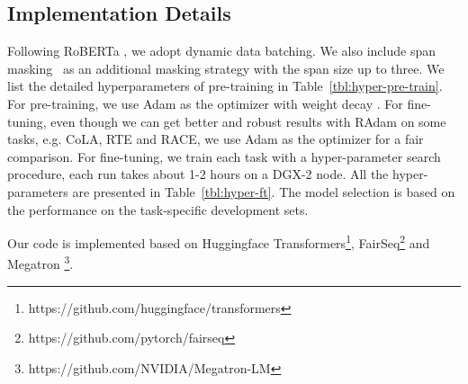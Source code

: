 \documentclass{article}
\begin{document}
\subsection{Implementation Details}
\label{subsec:details}
Following RoBERTa \citep{liu2019roberta}, we  adopt dynamic data batching. We also include span masking~\citep{joshi2019spanbert} as an additional masking strategy with the span size up to three. 
We list the detailed hyperparameters of pre-training in Table~\ref{tbl:hyper-pre-train}. For pre-training, we use Adam \citep{kingma2014adam} as the optimizer with weight decay \citep{loshchilov2018fixing}. For fine-tuning, even though we can get better and robust results with RAdam\citep{liu2019radam} on some tasks, e.g. CoLA, RTE and RACE, we use Adam\citep{kingma2014adam} as the optimizer for a fair comparison.
For fine-tuning, we train each task with a hyper-parameter search procedure, each run takes about 1-2 hours on a DGX-2 node. All the hyper-parameters are presented in Table~\ref{tbl:hyper-ft}. The model selection is based on the performance on the task-specific development sets. 

Our code is implemented based on Huggingface Transformers\footnote{https://github.com/huggingface/transformers}, FairSeq\footnote{https://github.com/pytorch/fairseq} and Megatron \citep{shoeybi2019megatron}\footnote{https://github.com/NVIDIA/Megatron-LM}.
\end{document}
